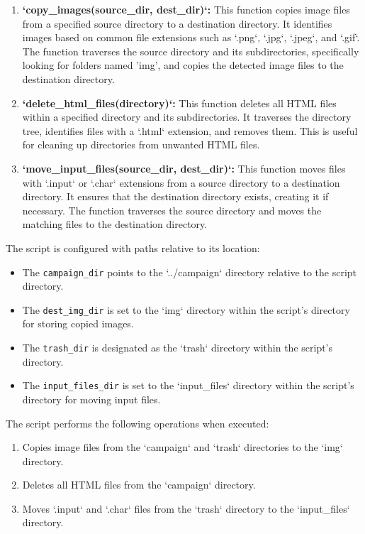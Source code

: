 \begin{enumerate}
    \item \textbf{`copy_images(source_dir, dest_dir)`:} This function copies image files from a specified source directory to a destination directory. It identifies images based on common file extensions such as `.png`, `.jpg`, `.jpeg`, and `.gif`. The function traverses the source directory and its subdirectories, specifically looking for folders named 'img', and copies the detected image files to the destination directory.

    \item \textbf{`delete_html_files(directory)`:} This function deletes all HTML files within a specified directory and its subdirectories. It traverses the directory tree, identifies files with a `.html` extension, and removes them. This is useful for cleaning up directories from unwanted HTML files.

    \item \textbf{`move_input_files(source_dir, dest_dir)`:} This function moves files with `.input` or `.char` extensions from a source directory to a destination directory. It ensures that the destination directory exists, creating it if necessary. The function traverses the source directory and moves the matching files to the destination directory.
\end{enumerate}

The script is configured with paths relative to its location:
\begin{itemize}
    \item The \texttt{campaign\_dir} points to the `../campaign` directory relative to the script directory.
    \item The \texttt{dest\_img\_dir} is set to the `img` directory within the script's directory for storing copied images.
    \item The \texttt{trash\_dir} is designated as the `trash` directory within the script's directory.
    \item The \texttt{input\_files\_dir} is set to the `input_files` directory within the script's directory for moving input files.
\end{itemize}

The script performs the following operations when executed:
\begin{enumerate}
    \item Copies image files from the `campaign` and `trash` directories to the `img` directory.
    \item Deletes all HTML files from the `campaign` directory.
    \item Moves `.input` and `.char` files from the `trash` directory to the `input_files` directory.
\end{enumerate}

